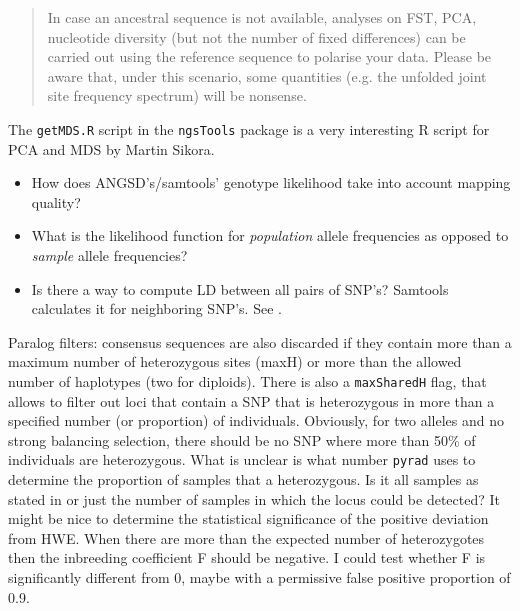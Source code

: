 \documentclass{article}\usepackage[]{graphicx}\usepackage[]{color}
\begin{document}
\begin{quotation}
In case an ancestral sequence is not available, analyses on FST, PCA, nucleotide diversity (but not the number of fixed differences) can be carried out using the reference sequence to polarise your data. Please be aware that, under this scenario, some quantities (e.g. the unfolded joint site frequency spectrum) will be nonsense.
\end{quotation}

The \texttt{getMDS.R} script in the \texttt{ngsTools} package is a very interesting R script for PCA and MDS by Martin Sikora.
\begin{itemize}
\item How does ANGSD's/samtools' genotype likelihood take into account mapping quality?
\item What is the likelihood function for \emph{population} allele frequencies as opposed to \emph{sample} allele frequencies?
\item Is there a way to compute LD between all pairs of SNP's? Samtools calculates it for neighboring SNP's. See \cite[section 2.3.3]{Li2011}.
\end{itemize}

Paralog filters: consensus sequences are also discarded if they contain more than a maximum number of heterozygous sites (maxH) or more than the allowed number of haplotypes (two for diploids). There is also a \texttt{maxSharedH} flag, that allows to filter out loci that contain a SNP that is heterozygous in more than a specified number (or proportion) of individuals. Obviously, for two alleles and no strong balancing selection, there should be no SNP where more than 50\% of individuals are heterozygous. What is unclear is what number \texttt{pyrad} uses to determine the proportion of samples that a heterozygous. Is it all samples as stated in \citep{Eaton2014} or just the number of samples in which the locus could be detected? It might be nice to determine the statistical significance of the positive deviation from HWE. When there are more than the expected number of heterozygotes then the inbreeding coefficient F should be negative. I could test whether F is significantly different from 0, maybe with a permissive false positive proportion of 0.9.
\end{document}
